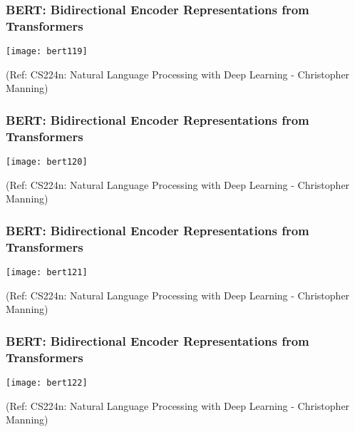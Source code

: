 \begin{frame}[fragile]\frametitle{BERT: Bidirectional Encoder Representations from Transformers}

			\begin{center}
			\texttt{[image: bert119]}
			\end{center}		
			
{\tiny (Ref: CS224n: Natural Language Processing with Deep Learning - Christopher Manning)}

\end{frame}

\begin{frame}[fragile]\frametitle{BERT: Bidirectional Encoder Representations from Transformers}

			\begin{center}
			\texttt{[image: bert120]}
			\end{center}		
			
{\tiny (Ref: CS224n: Natural Language Processing with Deep Learning - Christopher Manning)}

\end{frame}

\begin{frame}[fragile]\frametitle{BERT: Bidirectional Encoder Representations from Transformers}

			\begin{center}
			\texttt{[image: bert121]}
			\end{center}		
			
{\tiny (Ref: CS224n: Natural Language Processing with Deep Learning - Christopher Manning)}

\end{frame}

\begin{frame}[fragile]\frametitle{BERT: Bidirectional Encoder Representations from Transformers}

			\begin{center}
			\texttt{[image: bert122]}
			\end{center}		
			
{\tiny (Ref: CS224n: Natural Language Processing with Deep Learning - Christopher Manning)}

\end{frame}

